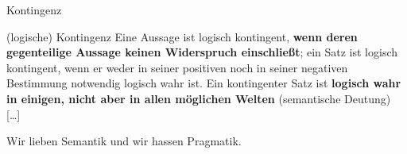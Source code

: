 \begin{frame}{Kontingenz}

\begin{block}{(logische) Kontingenz}
	Eine Aussage ist logisch kontingent, \textbf{wenn deren gegenteilige Aussage keinen Widerspruch einschließt}; ein Satz ist logisch kontingent, wenn er weder in seiner positiven noch in seiner negativen Bestimmung notwendig logisch wahr ist. Ein kontingenter Satz ist \textbf{logisch wahr in einigen, nicht aber in allen  möglichen Welten} (semantische Deutung) [\dots] \citep{Prechtl16b}
\end{block}

\ea Wir lieben Semantik und wir hassen Pragmatik.
\z 

\pause 

\begin{table}
	\centering	
\end{table} 

\end{frame}


%
%	
%		
%		
%	
%	
%
%		
%	
%	
%
%
%	
%


